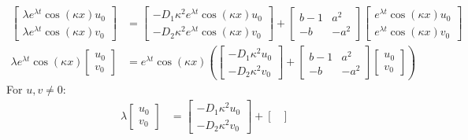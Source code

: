 \documentclass[12pt]{article}
\begin{document}
\begin{enumerate}
    \begin{align*}
        \begin{bmatrix}
            \lambda e^{\lambda t}\cos(\kappa x)u_0\\
            \lambda e^{\lambda t}\cos(\kappa x)v_0
        \end{bmatrix} &= \begin{bmatrix}
            -D_1\kappa^2 e^{\lambda t}\cos(\kappa x)u_0\\
            -D_2\kappa^2 e^{\lambda t}\cos(\kappa x)v_0
        \end{bmatrix} + \begin{bmatrix}
            b - 1 & a^2\\
            -b & -a^2
        \end{bmatrix} \begin{bmatrix}
            e^{\lambda t}\cos(\kappa x)u_0\\
            e^{\lambda t}\cos(\kappa x)v_0
        \end{bmatrix}\\
        \lambda e^{\lambda t}\cos(\kappa x) \begin{bmatrix}
            u_0\\v_0
        \end{bmatrix} &= e^{\lambda t}\cos(\kappa x) \left(\begin{bmatrix}
            -D_1 \kappa^2 u_0\\
            -D_2 \kappa^2 v_0
        \end{bmatrix} + \begin{bmatrix}
            b-1 & a^2\\
            -b & -a^2
        \end{bmatrix} \begin{bmatrix}
            u_0\\
            v_0
        \end{bmatrix}\right)
    \end{align*}
    For $u, v \neq 0$:
    \begin{align*}
        \lambda \begin{bmatrix}
            u_0\\v_0
        \end{bmatrix} &= \begin{bmatrix}
            -D_1 \kappa^2 u_0\\
            -D_2 \kappa^2 v_0
        \end{bmatrix} + \begin{bmatrix}

\end{bmatrix}
\end{align*}
\end{enumerate}
\end{document}
